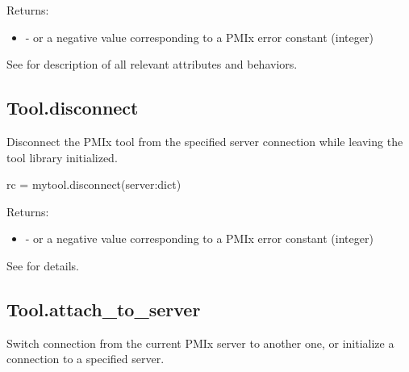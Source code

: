 Returns:

\begin{itemize}
    \item {} -  or a negative value corresponding to a PMIx error constant (integer)
\end{itemize}


See  for description of all relevant attributes and behaviors.


\subsection{Tool.disconnect}

\summary

Disconnect the \ac{PMIx} tool from the specified server connection while leaving the tool library initialized.

\format

\pyspecificstart
\begin{codepar}
rc = mytool.disconnect(server:dict)
\end{codepar}
\pyspecificend

\begin{arglist}
\end{arglist}

Returns:

\begin{itemize}
    \item {} -  or a negative value corresponding to a PMIx error constant (integer)
\end{itemize}

See  for details.


\subsection{Tool.attach_to_server}

\summary
Switch connection from the current \ac{PMIx} server to another one, or initialize a connection to a specified server.


\format


